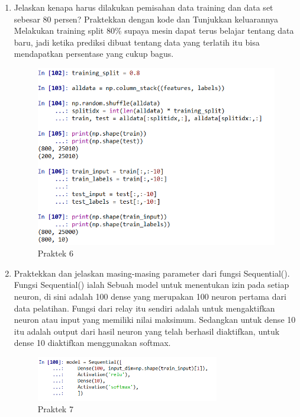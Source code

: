 \begin{enumerate}
\item  Jelaskan kenapa harus dilakukan pemisahan data training dan data set sebesar 80 persen? Praktekkan dengan kode dan Tunjukkan keluarannya
	\hfill\\
	Melakukan training split 80\% supaya mesin dapat terus belajar tentang data baru, jadi ketika prediksi dibuat tentang data yang terlatih itu bisa mendapatkan persentase yang cukup bagus.

\begin{figure}[H]
    \includegraphics[width=12cm]{figures/1174084/6/9.png}
    \centering
    \caption{Praktek 6}
\end{figure}

\item Praktekkan dan jelaskan masing-masing parameter dari fungsi Sequential().
	\hfill\\
	Fungsi Sequential() ialah Sebuah model untuk menentukan izin pada setiap neuron, di sini adalah 100 dense yang merupakan 100 neuron pertama dari data pelatihan. Fungsi dari relay itu sendiri adalah untuk mengaktifkan neuron atau input yang memiliki nilai maksimum. Sedangkan untuk dense 10 itu adalah output dari hasil neuron yang telah berhasil diaktifkan, untuk dense 10 diaktifkan menggunakan softmax.
	
\begin{figure}[H]
    \includegraphics[width=8cm]{figures/1174084/6/10.png}
    \centering
    \caption{Praktek 7}
\end{figure}


\end{enumerate}

